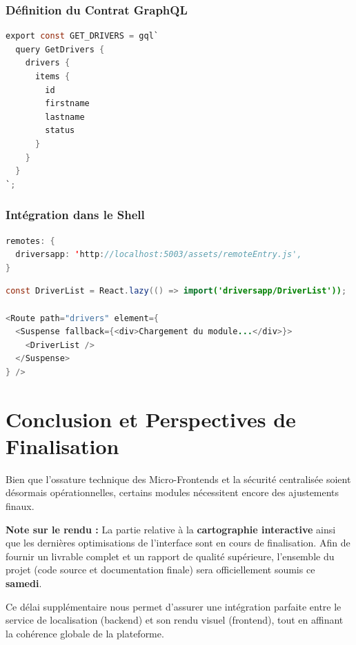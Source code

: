 \documentclass[12pt,a4paper]{article}
\begin{document}
\subsubsection{D\'{e}finition du Contrat GraphQL}
\begin{lstlisting}[language=Java, caption=drivers/src/queries.ts]
export const GET_DRIVERS = gql`
  query GetDrivers {
    drivers {
      items {
        id
        firstname
        lastname
        status
      }
    }
  }
`;
\end{lstlisting}

\subsubsection{Int\'{e}gration dans le Shell}
\begin{lstlisting}[language=Java, caption=shell/vite.config.ts]
remotes: {
  driversapp: 'http://localhost:5003/assets/remoteEntry.js',
}
\end{lstlisting}

\begin{lstlisting}[language=Java, caption=shell/App.tsx]
const DriverList = React.lazy(() => import('driversapp/DriverList'));

<Route path="drivers" element={
  <Suspense fallback={<div>Chargement du module...</div>}>
    <DriverList />
  </Suspense>
} />
\end{lstlisting}

\section{Conclusion et Perspectives de Finalisation}

Bien que l'ossature technique des Micro-Frontends et la s\'{e}curit\'{e} centralis\'{e}e soient d\'{e}sormais op\'{e}rationnelles, certains modules n\'{e}cessitent encore des ajustements finaux. 

\begin{infobox}
\textbf{Note sur le rendu :} La partie relative \`{a} la \textbf{cartographie interactive} ainsi que les derni\`{e}res optimisations de l'interface sont en cours de finalisation. Afin de fournir un livrable complet et un rapport de qualit\'{e} sup\'{e}rieure, l'ensemble du projet (code source et documentation finale) sera officiellement soumis ce \textbf{samedi}. 
\end{infobox}

Ce d\'{e}lai suppl\'{e}mentaire nous permet d'assurer une int\'{e}gration parfaite entre le service de localisation (backend) et son rendu visuel (frontend), tout en affinant la coh\'{e}rence globale de la plateforme.
\end{document}
